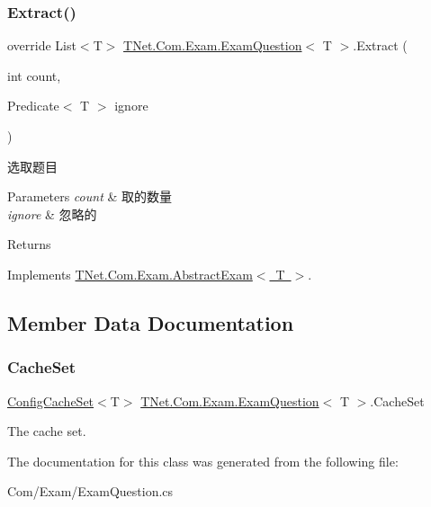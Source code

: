 \subsubsection{\texorpdfstring{Extract()}{Extract()}}
{\footnotesize\ttfamily override List$<$T$>$ \mbox{\hyperlink{class_t_net_1_1_com_1_1_exam_1_1_exam_question}{T\+Net.\+Com.\+Exam.\+Exam\+Question}}$<$ T $>$.Extract (\begin{DoxyParamCaption}\item[{int}]{count,  }\item[{Predicate$<$ T $>$}]{ignore }\end{DoxyParamCaption})\hspace{0.3cm}{\ttfamily [virtual]}}



选取题目 


\begin{DoxyParams}{Parameters}
{\em count} & 取的数量\\
\hline
{\em ignore} & 忽略的\\
\hline
\end{DoxyParams}
\begin{DoxyReturn}{Returns}

\end{DoxyReturn}


Implements \mbox{\hyperlink{class_t_net_1_1_com_1_1_exam_1_1_abstract_exam_a5c9f0c8798f5666caf68476f53d6d039}{T\+Net.\+Com.\+Exam.\+Abstract\+Exam$<$ T $>$}}.



\subsection{Member Data Documentation}
\mbox{\label{class_t_net_1_1_com_1_1_exam_1_1_exam_question_a3dd49fbd2aa337ce366d5d36b096a458}} 
\subsubsection{\texorpdfstring{Cache\+Set}{CacheSet}}
{\footnotesize\ttfamily \mbox{\hyperlink{class_t_net_1_1_cache_1_1_config_cache_set}{Config\+Cache\+Set}}$<$T$>$ \mbox{\hyperlink{class_t_net_1_1_com_1_1_exam_1_1_exam_question}{T\+Net.\+Com.\+Exam.\+Exam\+Question}}$<$ T $>$.Cache\+Set\hspace{0.3cm}{\ttfamily [protected]}}



The cache set. 



The documentation for this class was generated from the following file\+:\begin{DoxyCompactItemize}
\item 
Com/\+Exam/Exam\+Question.\+cs\end{DoxyCompactItemize}
